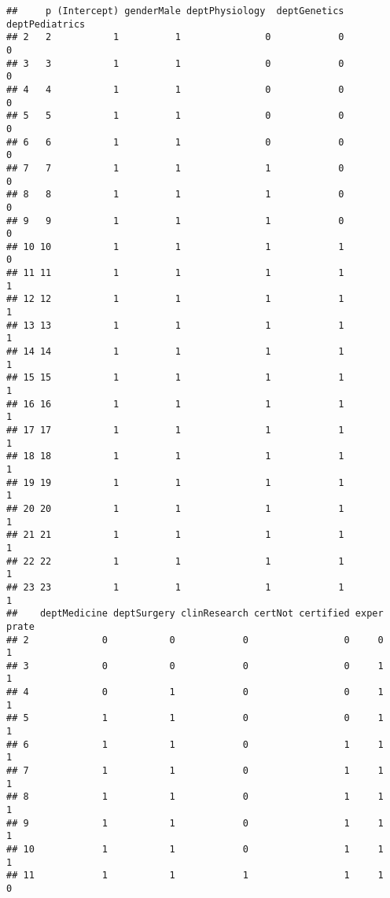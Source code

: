 \documentclass[]{article}
\begin{document}
\begin{verbatim}
##     p (Intercept) genderMale deptPhysiology  deptGenetics deptPediatrics
## 2   2           1          1               0            0              0
## 3   3           1          1               0            0              0
## 4   4           1          1               0            0              0
## 5   5           1          1               0            0              0
## 6   6           1          1               0            0              0
## 7   7           1          1               1            0              0
## 8   8           1          1               1            0              0
## 9   9           1          1               1            0              0
## 10 10           1          1               1            1              0
## 11 11           1          1               1            1              1
## 12 12           1          1               1            1              1
## 13 13           1          1               1            1              1
## 14 14           1          1               1            1              1
## 15 15           1          1               1            1              1
## 16 16           1          1               1            1              1
## 17 17           1          1               1            1              1
## 18 18           1          1               1            1              1
## 19 19           1          1               1            1              1
## 20 20           1          1               1            1              1
## 21 21           1          1               1            1              1
## 22 22           1          1               1            1              1
## 23 23           1          1               1            1              1
##    deptMedicine deptSurgery clinResearch certNot certified exper prate
## 2             0           0            0                 0     0     1
## 3             0           0            0                 0     1     1
## 4             0           1            0                 0     1     1
## 5             1           1            0                 0     1     1
## 6             1           1            0                 1     1     1
## 7             1           1            0                 1     1     1
## 8             1           1            0                 1     1     1
## 9             1           1            0                 1     1     1
## 10            1           1            0                 1     1     1
## 11            1           1            1                 1     1     0

\end{verbatim}
\end{document}
